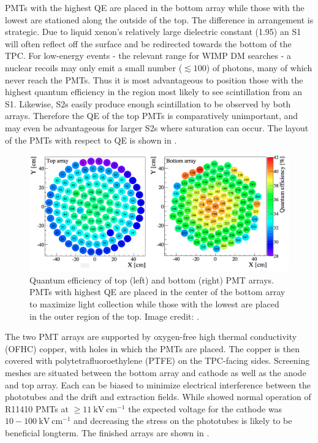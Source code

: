 PMTs with the highest QE are placed in the bottom array while those with the lowest are stationed along the outside of the
top.  The difference in arrangement is strategic.  Due to liquid xenon's relatively large dielectric constant (1.95) an S1 will
often reflect off the surface and be redirected towards the bottom of the TPC.  For low-energy events - the relevant range for WIMP DM
searches - a nuclear recoils may only emit a small number ($\lesssim 100$) of photons, many of which never reach the PMTs.  Thus it is
most advantageous to position those with the highest quantum efficiency in the region most likely to see scintillation from an
S1.  Likewise, S2s easily produce enough scintillation to be observed by both arrays.  Therefore the QE of the top PMTs is comparatively
unimportant, and may even be advantageous for larger S2s where saturation can occur.  The layout of the PMTs with respect to QE is shown
in .

\begin{figure}
\centering
\includegraphics[width=\textwidth]{PMTQuantumEfficiency}
\caption{Quantum efficiency of top (left) and bottom (right) PMT arrays.  PMTs with highest QE are placed in the center of the bottom
array to maximize light collection while those with the lowest are placed in the outer region of the top.  Image credit:
.}
\label{fig:xenon1t_pmt_qe}
\end{figure}

The two PMT arrays are supported by oxygen-free high thermal conductivity (OFHC) copper, with holes in which the PMTs are placed.  The
copper is then covered with polytetrafluoroethylene (PTFE) on the TPC-facing sides.  Screening meshes are situated between the bottom
array and cathode as well as the anode and top array.  Each can be biased to minimize electrical interference between the
phototubes and the drift and extraction fields.  While  showed normal operation of R11410 PMTs at
$\geq 11\ \mathrm{kV\ cm^{-1}}$ the expected voltage for the cathode was $10-100\ \mathrm{kV\ cm^{-1}}$ and decreasing the stress on the
phototubes is likely to be beneficial longterm.  The finished arrays are shown in .

